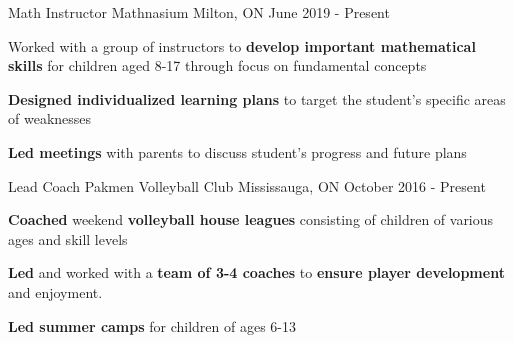 
\begin{cventries}
  \cventry
    {Math Instructor} %
    {Mathnasium} %
    {Milton, ON} %
    {June 2019 - Present} %
    {
      \begin{cvitems} %
        \item {Worked with a group of instructors to \textbf{develop important mathematical skills} for children aged 8-17 through focus on fundamental concepts}
        \item {\textbf{Designed individualized learning plans} to target the student's specific areas of weaknesses}
        \item {\textbf{Led meetings} with parents to discuss student's progress and future plans}
      \end{cvitems}
    }

  \cventry
    {Lead Coach} %
    {Pakmen Volleyball Club} %
    {Mississauga, ON} %
    {October 2016 - Present} %
    {
      \begin{cvitems} %
        \item {\textbf{Coached} weekend \textbf{volleyball house leagues} consisting of children of various ages and skill levels}
        \item {\textbf{Led} and worked with a \textbf{team of 3-4 coaches} to \textbf{ensure player development} and enjoyment.}
        \item {\textbf{Led summer camps} for children of ages 6-13}
      \end{cvitems}
    }

   
\end{cventries}
